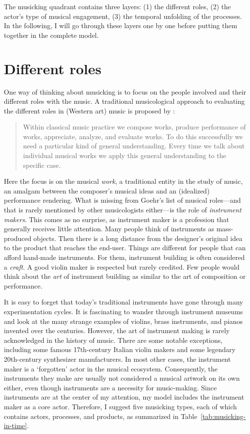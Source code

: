 The musicking quadrant contains three layers: (1) the different roles, (2) the actor's type of musical engagement, (3) the temporal unfolding of the processes. In the following, I will go through these layers one by one before putting them together in the complete model.


\section{Different roles}

One way of thinking about musicking is to focus on the people involved and their different roles with the music. A traditional musicological approach to evaluating the different roles in (Western art) music is proposed by \citet[p.102--3]{goehr_imaginary_1992}:

\begin{quote}
Within classical music practice we compose works, produce performance of works, appreciate, analyze, and evaluate works. To do this successfully we need a particular kind of general understanding. Every time we talk about individual musical works we apply this general understanding to the specific case.
\end{quote}

Here the focus is on the musical \emph{work}, a traditional entity in the study of music, an amalgam between the composer's musical ideas and an (idealized) performance rendering. What is missing from Goehr's list of musical roles---and that is rarely mentioned by other musicologists either---is the role of \emph{instrument makers}. This comes as no surprise, as instrument maker is a profession that generally receives little attention. Many people think of instruments as mass-produced objects. Then there is a long distance from the designer's original idea to the product that reaches the end-user. Things are different for people that can afford hand-made instruments. For them, instrument building is often considered a \emph{craft}. A good violin maker is respected but rarely credited. Few people would think about the \emph{art} of instrument building as similar to the art of composition or performance.

It is easy to forget that today's traditional instruments have gone through many experimentation cycles. It is fascinating to wander through instrument museums and look at the many strange examples of violins, brass instruments, and pianos invented over the centuries. However, the art of instrument making is rarely acknowledged in the history of music. There are some notable exceptions, including some famous 17th-century Italian violin makers and some legendary 20th-century synthesizer manufacturers. In most other cases, the instrument maker is a `forgotten' actor in the musical ecosystem. Consequently, the instruments they make are usually not considered a musical artwork on its own either, even though instruments are a necessity for music-making. Since instruments are at the center of my attention, my model includes the instrument maker as a core actor. Therefore, I suggest five musicking types, each of which contains actors, processes, and products, as summarized in Table~\ref{tab:musicking-in-time}.

